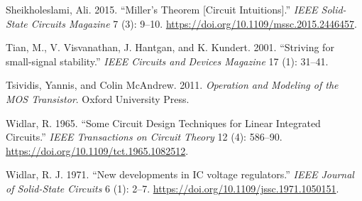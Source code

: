 \documentclass[
  a4paper,
  DIV=11,
  numbers=noendperiod]{scrartcl}
\newlength{\cslhangindent}
\newenvironment{CSLReferences}[2] %
 {\begin{list}{}{%
  \setlength{\itemindent}{0pt}
  \setlength{\leftmargin}{0pt}
  \setlength{\parsep}{0pt}
  \ifodd #1
   \setlength{\leftmargin}{\cslhangindent}
   \setlength{\itemindent}{-1\cslhangindent}
  \fi
  \setlength{\itemsep}{#2\baselineskip}}}
 {\end{list}}
\begin{document}
\begin{CSLReferences}{1}{0}
Sheikholeslami, Ali. 2015. {``{Miller's Theorem {[}Circuit
Intuitions{]}}.''} \emph{IEEE Solid-State Circuits Magazine} 7 (3):
9--10. \url{https://doi.org/10.1109/mssc.2015.2446457}.

Tian, M., V. Visvanathan, J. Hantgan, and K. Kundert. 2001. {``{Striving
for small-signal stability}.''} \emph{IEEE Circuits and Devices
Magazine} 17 (1): 31--41.

Tsividis, Yannis, and Colin McAndrew. 2011. \emph{Operation and Modeling
of the MOS Transistor}. Oxford University Press.

Widlar, R. 1965. {``{Some Circuit Design Techniques for Linear
Integrated Circuits}.''} \emph{IEEE Transactions on Circuit Theory} 12
(4): 586--90. \url{https://doi.org/10.1109/tct.1965.1082512}.

Widlar, R. J. 1971. {``{New developments in IC voltage regulators}.''}
\emph{IEEE Journal of Solid-State Circuits} 6 (1): 2--7.
\url{https://doi.org/10.1109/jssc.1971.1050151}.

\end{CSLReferences}
\end{document}

